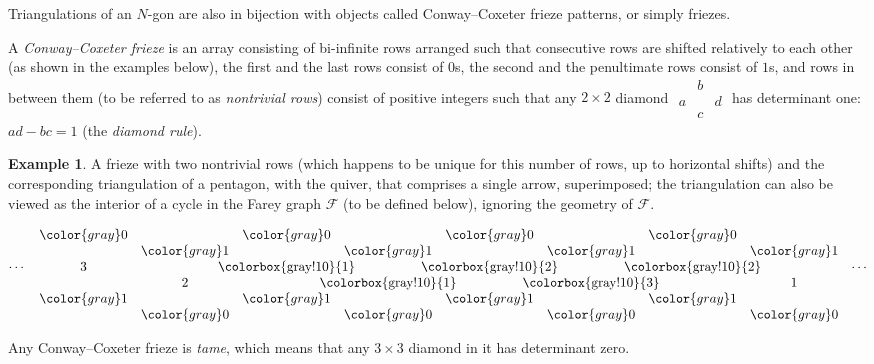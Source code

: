 \documentclass[12pt]{article}
\theoremstyle{definition}
\newtheorem{example}{Example}
\newcommand{\F}{\mathscr{F}}
\newcommand{\triv}[1]{{\color{gray} #1}}
\newcommand{\fundom}[1]{\clap{\colorbox{gray!10}{\vphantom{1}#1}}}
\begin{document}
Triangulations of an $N$-gon are also in bijection with objects called Conway--Coxeter frieze patterns, or simply friezes.

A \emph{Conway--Coxeter frieze} \cite{ConwayCoxeter} is an array consisting of bi-infinite rows arranged such that consecutive rows are shifted relatively to each other (as shown in the examples below), the first and the last rows consist of $0$s, the second and the penultimate rows consist of $1$s, and rows in between them (to be referred to as \emph{nontrivial rows}) consist of positive integers such that any $2\times2$ diamond $\begin{smallmatrix}&b\\a&&d\\&c\end{smallmatrix}$ has determinant one: $ad-bc=1$ (the \emph{diamond rule}).
\begin{example}
\label{ex:ccf}
A frieze with two nontrivial rows (which happens to be unique for this number of rows, up to horizontal shifts) and the corresponding triangulation of a pentagon, with the quiver, that comprises a single arrow, superimposed; the triangulation can also be viewed as the interior of a cycle in the Farey graph $\F$ (to be defined below), ignoring the geometry of $\F$.

\begin{center}
\(
\begin{matrix}
&\triv0 && \triv0 && \triv0 && \triv0 \\
&& \triv1 && \triv1 && \triv1 && \triv1 \\
\cdots&3 && \fundom1 && \fundom2 && \fundom2 && \cdots \\
&& 2 && \fundom1 && \fundom3      && 1 \\
&\triv1 && \triv1 && \triv1 && \triv1 \\
&& \triv0 && \triv0 && \triv0 && \triv0 \\ 
\end{matrix}
\)
\qquad
{}
\end{center}
\end{example}
Any Conway--Coxeter frieze is \emph{tame}, which means that any $3\times3$ diamond in it has determinant zero.
\end{document}
